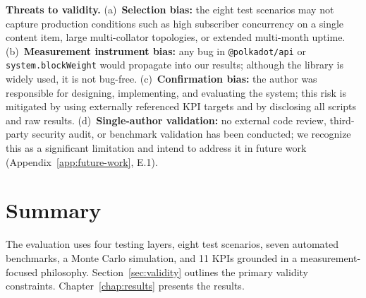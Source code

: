 \textbf{Threats to validity.} (a)~\textbf{Selection bias:} the eight test scenarios may not capture production conditions such as high subscriber concurrency on a single content item, large multi-collator topologies, or extended multi-month uptime. (b)~\textbf{Measurement instrument bias:} any bug in \texttt{@polkadot/api} or \texttt{system.blockWeight} would propagate into our results; although the library is widely used, it is not bug-free. (c)~\textbf{Confirmation bias:} the author was responsible for designing, implementing, and evaluating the system; this risk is mitigated by using externally referenced KPI targets and by disclosing all scripts and raw results. (d)~\textbf{Single-author validation:} no external code review, third-party security audit, or benchmark validation has been conducted; we recognize this as a significant limitation and intend to address it in future work (Appendix~\ref{app:future-work}, E.1).

\section{Summary}\label{sec:chapter-6-summary}

The evaluation uses four testing layers, eight test scenarios, seven automated benchmarks, a Monte Carlo simulation, and 11 KPIs grounded in a measurement-focused philosophy. Section~\ref{sec:validity} outlines the primary validity constraints. Chapter~\ref{chap:results} presents the results.
